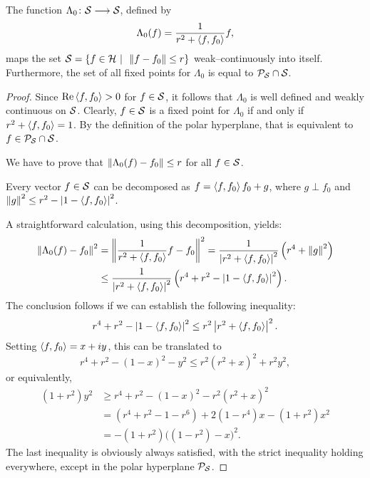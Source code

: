 \begin{lem} \label{l:SCALE}
The function $\Lambda_0\colon {\cal S} \longrightarrow {\cal S}$, defined by
\[ \Lambda_0(f) = \frac{1}{r^2+\left<f,f_0\right>} f, \]
maps the set ${\cal S} = \left\{f\in{\cal H}\,\,|\,\,\, \left\Vert f-f_0\right\Vert\leq r\right\}$
weak--continuously into itself. Furthermore, the set of all
fixed points for $\Lambda_0$ is equal to ${\cal P}_{{\cal S}} \cap {\cal S}$.
\end{lem}

\begin{proof}
Since $\operatorname{Re}\left<f,f_0\right>>0$ for $f\in{\cal S}$, it follows that
$\Lambda_0$ is well defined and weakly continuous on ${\cal S}$.
Clearly, $f\in{\cal S}$ is a fixed point for $\Lambda_0$ if and only
if $r^2 + \left<f,f_0\right>=1$. By the definition of the polar
hyperplane, that is equivalent to $f\in{\cal P}_{{\cal S}}\cap{\cal S}$.

We have to prove that $\left\Vert\Lambda_0(f)-f_0\right\Vert\leq r$ for all
$f\in{\cal S}$.

Every vector $f\in{\cal S}$ can be decomposed as
$f=\left<f,f_0\right>f_0+g$, where $g \perp f_0$ and $\left\Vert g\right\Vert^2\leq
r^2 - \left\vert1-\left<f,f_0\right>\right\vert^2$.

A straightforward calculation, using this decomposition,
yields:
\begin{equation*}
\begin{split}
  \left\Vert\Lambda_0(f)-f_0\right\Vert^2
  &= \left\Vert\frac{1}{r^2+\left<f,f_0\right>} f - f_0\right\Vert^2
      = \frac{1}{\left\vert r^2+\left<f,f_0\right>\right\vert^2} \left(r^4+\left\Vert g\right\Vert^2\right)\\
  &\leq \frac{1}{\left\vert r^2+\left<f,f_0\right>\right\vert^2}
        \left(r^4+r^2-\left\vert1-\left<f,f_0\right>\right\vert^2\right).
\end{split}
\end{equation*}
The conclusion follows if we can establish the following
inequality:
\[ r^4+r^2 - \left\vert1-\left<f,f_0\right>\right\vert^2 \leq r^2\left\vert r^2+\left<f,f_0\right>\right\vert^2. \]
Setting $\left<f,f_0\right>=x+i{}y$, this can be translated to
\[ r^4+r^2 - (1-x)^2 - y^2 \leq r^2(r^2 + x)^2 + r^2y^2, \]
or equivalently,
\begin{equation*}
\begin{split}
 (1+r^2)y^2 &\geq r^4+r^2 - (1-x)^2 - r^2(r^2 + x)^2\\
            & =  (r^4+r^2-1-r^6) + 2(1-r^4)x - (1+r^2)x^2  \\
            & = -(1+r^2)\big((1-r^2) - x\big)^2.
\end{split}
\end{equation*}
The last inequality is obviously always satisfied, with the
strict inequality holding everywhere, except in the polar
hyperplane ${\cal P}_{{\cal S}}$.
\end{proof}

